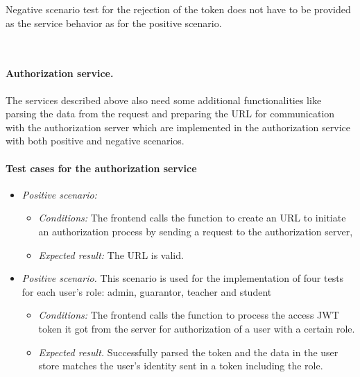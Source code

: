 \noindent Negative scenario test for the rejection of the token does not have to be provided as the service behavior as for the positive scenario.

\


\paragraph*{Authorization service.} The services described above also need some additional functionalities like parsing the data from the request and preparing the URL for communication with the authorization server which are implemented in the authorization service with both positive and negative scenarios. 


\paragraph*{Test cases for the authorization service} 
\begin{itemize}
    \item \emph{Positive scenario:} 
        \begin{itemize}
            \item \emph{Conditions:} The frontend calls the function to create an URL to initiate an authorization process by sending a request to the authorization server,
            \item \emph{Expected result:} The URL is valid.
        \end{itemize}
    \item \emph{Positive scenario.} This scenario is used for the implementation of four tests for each user's role: admin, guarantor, teacher and student
        \begin{itemize}
            \item \emph{Conditions:} The frontend calls the function to process the access JWT token it got from the server for authorization of a user with a certain role.
            \item \emph{Expected result.} Successfully parsed the token and the data in the user store matches the user's identity sent in a token including the role.
        \end{itemize}
\end{itemize}

\ 

